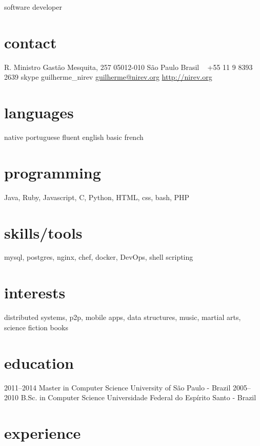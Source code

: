 \documentclass{friggeri-cv}
\begin{document}
       {software developer}


\begin{aside}
  \section{contact}
    R. Ministro Gastão Mesquita, 257
    05012-010 São Paulo
    Brasil
    ~
    +55 11 9 8393 2639
    {\footnotesize skype} guilherme\_nirev
    \href{mailto:guilherme@nirev.org}{guilherme@nirev.org}
    \href{http://nirev.org}{http://nirev.org}
  \section{languages}
    native portuguese
    fluent english
    basic french
  \section{programming}
    Java, Ruby, Javascript, C, Python,
    HTML, css, bash, PHP
  \section{skills/tools}
    mysql, postgres,
    nginx, chef, docker, DevOps,
    shell scripting
  \section{interests}
distributed systems, p2p, mobile apps, data structures, music, martial arts, science fiction books
\end{aside}


\section{education}

\begin{entrylist}

\entry
  {2011–2014}
  {Master in Computer Science}
  {University of São Paulo - Brazil}{}
\entry
  {2005–2010}
  {B.Sc. in Computer Science}
  {Universidade Federal do Espírito Santo - Brazil}{}
\end{entrylist}

\section{experience}
\end{document}
